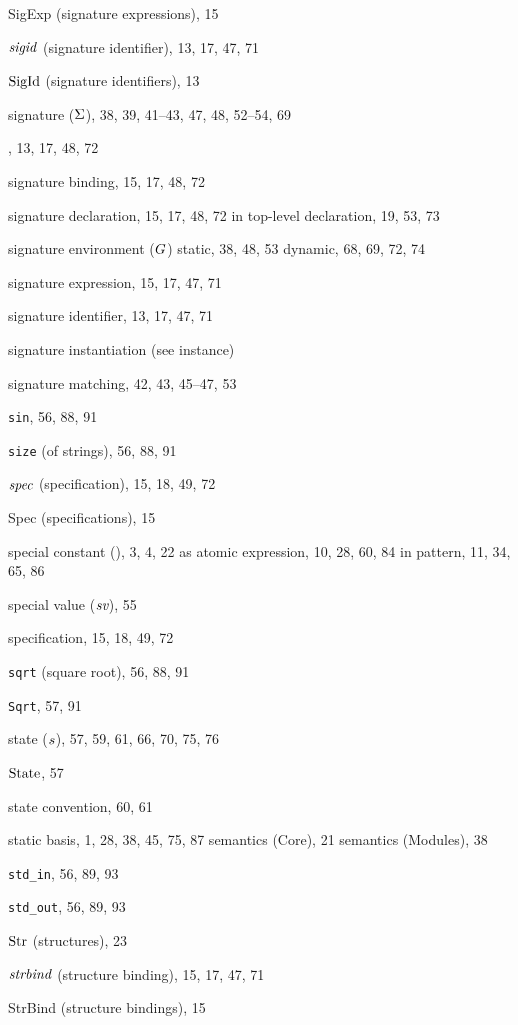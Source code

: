 \begin{theindex}
\item SigExp (signature expressions), 15
\item ${\it sigid}$ (signature identifier), 13, 17, 47, 71
\item ${\rm SigId}$ (signature identifiers), 13
\item signature ($\Sigma$), 38, 39, 41--43, 47, 48, 52--54, 69
\item \SIGNATURE, 13, 17, 48, 72
\item signature binding, 15, 17, 48, 72
\item signature declaration, 15, 17, 48, 72
\subitem in top-level declaration, 19, 53, 73
\item signature environment ($G$) 
\subitem static, 38, 48, 53
\subitem dynamic, 68, 69, 72, 74
\item signature expression, 15, 17, 47, 71
\item signature identifier, 13, 17, 47, 71
\item signature instantiation (see instance) 
\item signature matching, 42, 43, 45--47, 53
\item {\tt sin}, 56, 88, 91
\item {\tt size} (of strings), 56, 88, 91
\item ${\it spec}$ (specification), 15, 18, 49, 72
\item Spec (specifications), 15
\item special constant (\scon), 3, 4, 22
\subitem as atomic expression, 10, 28, 60, 84
\subitem in pattern, 11, 34, 65, 86
\item special value ($\mbox{\it sv}$), 55
\item specification, 15, 18, 49, 72
\item {\tt sqrt} (square root), 56, 88, 91
\item {\tt Sqrt}, 57, 91
\item state ($s$), 57, 59, 61, 66, 70, 75, 76
\item ${\rm State}$, 57
\item state convention, 60, 61
\item static 
\subitem basis, 1, 28, 38, 45, 75, 87
\subitem semantics (Core), 21
\subitem semantics (Modules), 38
\item \verb+std_in+, 56, 89, 93
\item \verb+std_out+, 56, 89, 93
\item ${\rm Str}$ (structures), 23
\item ${\it strbind}$ (structure binding), 15, 17, 47, 71
\item StrBind (structure bindings), 15

\end{theindex}
